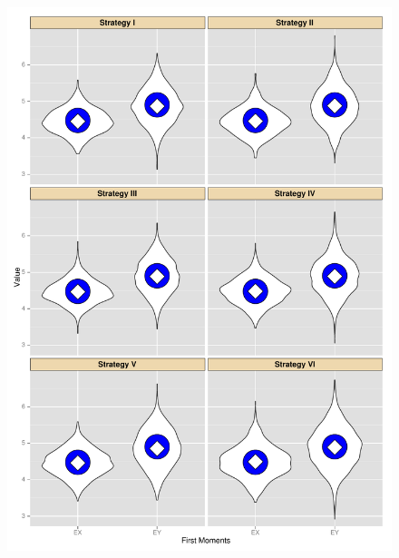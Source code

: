 \documentclass{book}
\begin{document}
\begin{figure}
	\begin{minipage}[b]{.5\linewidth}
		\centering \includegraphics[width=\textwidth,keepaspectratio=TRUE]{./img/firstMomentsBaragatti.pdf}
		\label{firstMomentsBaragatti}
	\end{minipage}%
	\begin{minipage}[b]{.5\linewidth}

\end{minipage}
\end{figure}
\end{document}
